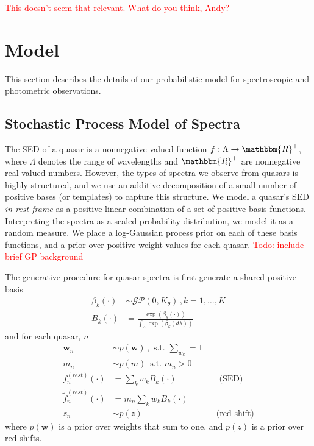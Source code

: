 \documentclass{article}
\newcommand{\R}{\mathbbm{R}}
\newcommand{\red}[1]{\textcolor{red}{#1}}
\begin{document}
\red{This doesn't seem that relevant. What do you think, Andy?}


\section{Model}
This section describes the details of our probabilistic model for spectroscopic and photometric observations.  

\subsection{Stochastic Process Model of Spectra}
The SED of a quasar is a nonnegative valued function $f : \Lambda \rightarrow \R^+$, where $\Lambda$ denotes the range of wavelengths and $\R^+$ are nonnegative real-valued numbers.  However, the types of spectra we observe from quasars is highly structured, and we use an additive decomposition of a small number of positive bases (or templates) to capture this structure.   We model a quasar's SED \emph{in rest-frame} as a positive linear combination of a set of positive basis functions.  Interpreting the spectra as a scaled probability distribution, we model it as a random measure.  We place a log-Gaussian process prior on each of these basis functions, and a prior over positive weight values for each quasar.  
\red{Todo: include brief GP background}

The generative procedure for quasar spectra is first generate a shared positive basis
\begin{align}
  \beta_k(\cdot) &\sim \mathcal{GP}(0, K_\theta) \, , k=1, \dots, K\\
  B_k(\cdot) &= \frac{\exp(\beta_k(\cdot))}{\int_\Lambda \exp(\beta_k(d \lambda))}   
\end{align}
and for each quasar, $n$
\begin{align}
  \mathbf{w}_n &\sim p(\mathbf{w}) \, , \text{ s.t. } \sum_{w_k} = 1  \\
  m_n  &\sim p(m) \, \text{ s.t. } m_n > 0 \\
  f^{(rest)}_n(\cdot) &= \sum_{k} w_k B_k(\cdot) &&\text{ (SED) }\\
  \tilde f^{(rest)}_n(\cdot) &= m_n \sum_{k} w_k B_k(\cdot) \\
  z_n &\sim p(z) &&\text{(red-shift)}
\end{align}
where $p(\mathbf{w})$ is a prior over weights that sum to one, and $p(z)$ is a prior over red-shifts. 
\end{document}
